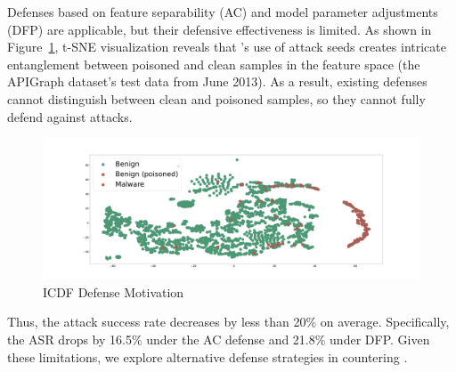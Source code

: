 Defenses based on feature separability (AC) and model parameter adjustments (DFP) are applicable, but their defensive effectiveness is limited.
As shown in Figure~\ref{fig:ICDF Defense Motivation}, t-SNE
visualization reveals that \pandora's use of attack seeds creates intricate entanglement between poisoned and clean samples in the
feature space (the APIGraph dataset's test data from June 2013).
As a result, existing defenses cannot distinguish between clean and poisoned samples, so they cannot fully defend against \pandora attacks.
\begin{figure}[h!]
	\centering
	\includegraphics[width=\linewidth,keepaspectratio]{Graph/Evaluation/Figure20.pdf}
	\caption{ICDF Defense Motivation}
	\label{fig:ICDF Defense Motivation}
\end{figure}
Thus, the attack success rate decreases by less than 20\% on average. Specifically, the ASR drops by 16.5\% under the AC defense and 21.8\% under DFP.
Given these limitations, we explore alternative defense strategies in countering \pandora.

